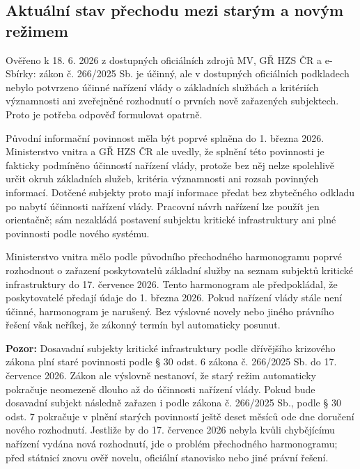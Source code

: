 \documentclass[11pt,a4paper]{article}
\newcommand{\pozor}[1]{\begin{tcolorbox}[breakable,enhanced,colback=red!7,colframe=red!30!black,boxrule=0pt,arc=1mm,left=5pt,right=5pt,top=5pt,bottom=5pt,before skip=6pt,after skip=6pt]\textbf{Pozor:} #1\end{tcolorbox}}
\begin{document}
\subsection*{Aktuální stav přechodu mezi starým a novým režimem}
Ověřeno k 18. 6. 2026 z dostupných oficiálních zdrojů MV, GŘ HZS ČR a e-Sbírky: zákon č. 266/2025 Sb. je účinný, ale v dostupných oficiálních podkladech nebylo potvrzeno účinné nařízení vlády o základních službách a kritériích významnosti ani zveřejněné rozhodnutí o prvních nově zařazených subjektech. Proto je potřeba odpověď formulovat opatrně.

Původní informační povinnost měla být poprvé splněna do 1. března 2026. Ministerstvo vnitra a GŘ HZS ČR ale uvedly, že splnění této povinnosti je fakticky podmíněno účinností nařízení vlády, protože bez něj nelze spolehlivě určit okruh základních služeb, kritéria významnosti ani rozsah povinných informací. Dotčené subjekty proto mají informace předat bez zbytečného odkladu po nabytí účinnosti nařízení vlády. Pracovní návrh nařízení lze použít jen orientačně; sám nezakládá postavení subjektu kritické infrastruktury ani plné povinnosti podle nového systému.

Ministerstvo vnitra mělo podle původního přechodného harmonogramu poprvé rozhodnout o zařazení poskytovatelů základní služby na seznam subjektů kritické infrastruktury do 17. července 2026. Tento harmonogram ale předpokládal, že poskytovatelé předají údaje do 1. března 2026. Pokud nařízení vlády stále není účinné, harmonogram je narušený. Bez výslovné novely nebo jiného právního řešení však neříkej, že zákonný termín byl automaticky posunut.

\pozor{Dosavadní subjekty kritické infrastruktury podle dřívějšího krizového zákona plní staré povinnosti podle § 30 odst. 6 zákona č. 266/2025 Sb. do 17. července 2026. Zákon ale výslovně nestanoví, že starý režim automaticky pokračuje neomezeně dlouho až do účinnosti nařízení vlády. Pokud bude dosavadní subjekt následně zařazen i podle zákona č. 266/2025 Sb., podle § 30 odst. 7 pokračuje v plnění starých povinností ještě deset měsíců ode dne doručení nového rozhodnutí. Jestliže by do 17. července 2026 nebyla kvůli chybějícímu nařízení vydána nová rozhodnutí, jde o problém přechodného harmonogramu; před státnicí znovu ověř novelu, oficiální stanovisko nebo jiné právní řešení.}
\end{document}
